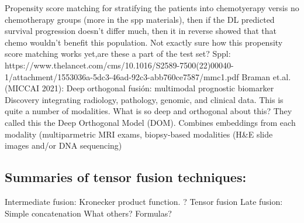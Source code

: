 \documentclass{article}%
\begin{document}
%
Propensity score matching for stratifying the patients into chemotyerapy versis no chemotherapy groups (more in the spp materials), then if the DL predicted survival progression doesn’t differ much, then it in reverse showed that that chemo wouldn’t benefit this population. Not exactly sure how this propensity score matching works yet,are these a part of the test set? %
\newline%
\newline%
%
Sppl: https://www.thelancet.com/cms/10.1016/S2589{-}7500(22)00040{-}1/attachment/1553036a{-}5dc3{-}46ad{-}92c3{-}abb760ce7587/mmc1.pdf %
\newline%
\newline%
%
Braman et.al. (MICCAI 2021): Deep orthogonal fusión: multimodal prognostic biomarker Discovery integrating radiology, pathology, genomic, and clinical data. %
\newline%
\newline%
%
This is quite a number of modalities. %
\newline%
\newline%
%
What is so deep and orthogonal about this? They called this the Deep Orthogonal Model (DOM). %
\newline%
\newline%
%
Combines embeddings from each modality (multiparmetric MRI exams, biopsy{-}based modalities (H\&E slide images and/or DNA sequencing)%
\newline%
\newline%
%
\subsection{Summaries of tensor fusion techniques: }%
\label{subsec:Summariesoftensorfusiontechniques}%

%
Intermediate fusion: %
\newline%
\newline%
%
Kronecker product function. %
\newline%
\newline%
%
? %
\newline%
\newline%
%
Tensor fusion %
\newline%
\newline%
%
Late fusion:%
\newline%
\newline%
%
Simple concatenation %
\newline%
\newline%
%
What others? %
\newline%
\newline%
%
Formulas? %
\newline%
\newline%
%
\end{document}
